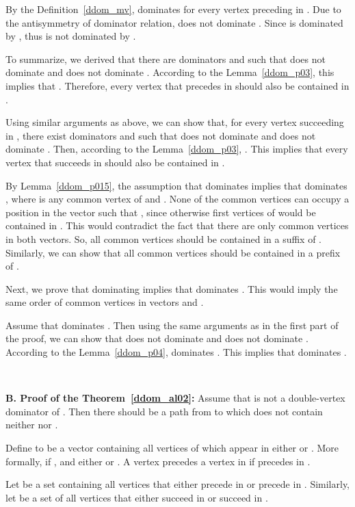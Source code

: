 \documentclass{llncs}
\begin{document}
By the Definition~\ref{ddom_mv},  dominates
 for every vertex  preceding  in .
Due to the antisymmetry of dominator relation,  does not dominate
. Since  is dominated by ,
thus  is not dominated by .

To summarize, we derived that there are dominators  and
 such that  does not dominate  and
 does not dominate . According to the
Lemma~\ref{ddom_p03}, this implies that . Therefore, 
every vertex  that precedes  in 
should also be contained in .

Using similar arguments as above, we can show that, for every vertex  succeeding  in ,
there exist dominators
 and  such that 
does not dominate  and  does not dominate
. Then, according to the Lemma~\ref{ddom_p03}, . 
This implies that every vertex  that succeeds  in 
should also be contained in .

By Lemma~\ref{ddom_p015}, the assumption that  dominates   implies that  dominates ,
where  is any common vertex of  and . None of the common vertices can occupy a position  in the vector
 such that , since otherwise  first vertices of  would be
contained in . This would contradict the fact that there are
only  common vertices in both vectors. So, all  common vertices
should be contained in a suffix of . Similarly, we can show
that all  common vertices should be contained in a prefix of . 

Next, we prove that  dominating  implies that
 dominates . This would imply the same
order of common vertices in vectors  and .

Assume that  dominates .
Then using the same arguments as in the first part of the proof, we
can show that  does not
dominate  and  does not dominate . According to the
Lemma~\ref{ddom_p04},  dominates . This implies that
 dominates .
\begin{flushright}
 \\
\end{flushright}

{\bf B. Proof of the Theorem~\ref{ddom_al02}:} 
Assume that  is not a double-vertex
dominator of . Then there should be a path  from  to  which
does not contain neither  nor . 

Define  to be a vector containing all vertices of
 which appear in either
 or . More formally,  if , and
either  or .  A vertex  precedes a vertex  in
 if  precedes  in .

Let  be a set containing all vertices that either precede  in
 or precede   in .
Similarly, let  be a set of all vertices
that either succeed  in  or succeed  in .
\end{document}
